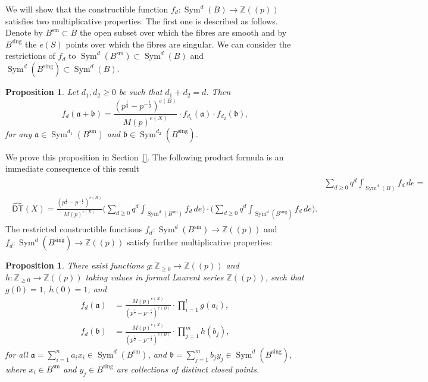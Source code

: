 \documentclass{amsart}
\newtheorem{proposition}[theorem]{Proposition}
\theoremstyle{definition}
\newcommand{\ZZ} {\mathbb{Z}}		%
\newcommand{\Sym}{\operatorname{Sym}}
\newcommand{\DT}{\mathsf{DT}}
\newcommand{\sm}{\operatorname{sm}}
\newcommand{\sing}{\operatorname{sing}}
\newcommand{\DThat}{\widehat{\DT}}
\begin{document}
We will show that the constructible function $f_d : \Sym^d(B)
\rightarrow \ZZ(\!(p)\!)$ satisfies two multiplicative properties. The
first one is described as follows. Denote by $B^{\sm} \subset B$ the
open subset over which the fibres are smooth and by $B^{\sing}$ the
$e(S)$ points over which the fibres are singular. We can consider the
restrictions of $f_d$ to $\Sym^d(B^{\sm}) \subset \Sym^d(B)$ and
$\Sym^d(B^{\sing}) \subset \Sym^d(B)$.
\begin{proposition} \label{mult1}
Let $d_1, d_2 \geq 0$ be such that $d_1+d_2 = d$. Then 
$$ 
f_d(\mathfrak{a} + \mathfrak{b}) =\frac{(p^{\frac{1}{2}} - p^{-\frac{1}{2}})^{e(B)}}{M(p)^{e(X)}} \cdot f_{d_1}(\mathfrak{a}) \cdot f_{d_2}(\mathfrak{b}), 
$$
for any $\mathfrak{a} \in \Sym^{d_1}(B^{\sm})$ and $\mathfrak{b} \in \Sym^{d_2}(B^{\sing})$. 
\end{proposition}
We prove this proposition in Section~\ref{}. The following
product formula is an immediate consequence of this result
\begin{align}
\begin{split} \label{firstprod}
&\sum_{d \geq 0} q^d \int_{\Sym^d(B)} f_d \, de = \\
\DThat (X)  = \frac{(p^{\frac{1}{2}} - p^{-\frac{1}{2}})^{e(B)}}{M(p)^{e(X)}}  \Bigg( \sum_{d \geq 0} q^d \int_{\Sym^d(B^{\sm})} f_d \, de \Bigg) \cdot \Bigg( \sum_{d \geq 0} q^d \int_{\Sym^d(B^{\sing})} f_d \, de \Bigg). 
\end{split}
\end{align}
The restricted constructible functions $f_d : \Sym^d(B^{\sm})
\rightarrow \ZZ(\!(p)\!)$ and $f_d : \Sym^d(B^{\sing}) \rightarrow
\ZZ(\!(p)\!)$ satisfy further multiplicative properties:
\begin{proposition} \label{mult2}
There exist functions $g : \ZZ_{\geq 0} \rightarrow \ZZ(\!(p)\!)$ and
$h : \ZZ_{\geq 0} \rightarrow \ZZ(\!(p)\!)$ taking values in formal
Laurent series $\ZZ(\!(p)\!)$, such that $g(0)=1$, $h(0)=1$, and
\begin{align*}
f_{d}(\mathfrak{a}) &= \frac{M(p)^{e(X)}}{(p^{\frac{1}{2}} - p^{-\frac{1}{2}})^{e(B)}} \cdot \prod_{i=1}^l g(a_i), \\
f_{d}(\mathfrak{b}) &= \frac{M(p)^{e(X)}}{(p^{\frac{1}{2}} -
p^{-\frac{1}{2}})^{e(B)}} \cdot \prod_{j=1}^m h(b_j),
\end{align*}
for all $\mathfrak{a} = \sum_{i=1}^{n} a_i x_i \in \Sym^{d}(B^{\sm})$,
and $\mathfrak{b} = \sum_{j=1}^m b_j y_j \in \Sym^{d}(B^{\sing})$,
where $x_i \in B^{\sm}$ and $y_j \in B^{\sing}$ are collections of
distinct closed points.
\end{proposition}
\end{document}
